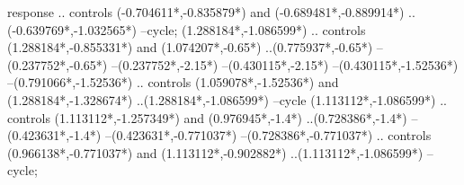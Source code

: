 {\begin{scope}[x=1mm,y=1mm,line width=\SCstroke mm,line cap=round,line join=round]
\begin{SCpart}{response}
.. controls ({-0.704611*\SCscale},{-0.835879*\SCscale}) and ({-0.689481*\SCscale},{-0.889914*\SCscale}) ..({-0.639769*\SCscale},{-1.032565*\SCscale})
--cycle;
 ({1.288184*\SCscale},{-1.086599*\SCscale})
.. controls ({1.288184*\SCscale},{-0.855331*\SCscale}) and ({1.074207*\SCscale},{-0.65*\SCscale}) ..({0.775937*\SCscale},{-0.65*\SCscale})
--({0.237752*\SCscale},{-0.65*\SCscale})
--({0.237752*\SCscale},{-2.15*\SCscale})
--({0.430115*\SCscale},{-2.15*\SCscale})
--({0.430115*\SCscale},{-1.52536*\SCscale})
--({0.791066*\SCscale},{-1.52536*\SCscale})
.. controls ({1.059078*\SCscale},{-1.52536*\SCscale}) and ({1.288184*\SCscale},{-1.328674*\SCscale}) ..({1.288184*\SCscale},{-1.086599*\SCscale})
--cycle
({1.113112*\SCscale},{-1.086599*\SCscale})
.. controls ({1.113112*\SCscale},{-1.257349*\SCscale}) and ({0.976945*\SCscale},{-1.4*\SCscale}) ..({0.728386*\SCscale},{-1.4*\SCscale})
--({0.423631*\SCscale},{-1.4*\SCscale})
--({0.423631*\SCscale},{-0.771037*\SCscale})
--({0.728386*\SCscale},{-0.771037*\SCscale})
.. controls ({0.966138*\SCscale},{-0.771037*\SCscale}) and ({1.113112*\SCscale},{-0.902882*\SCscale}) ..({1.113112*\SCscale},{-1.086599*\SCscale})
--cycle;
\end{SCpart}
  \end{scope}%
}